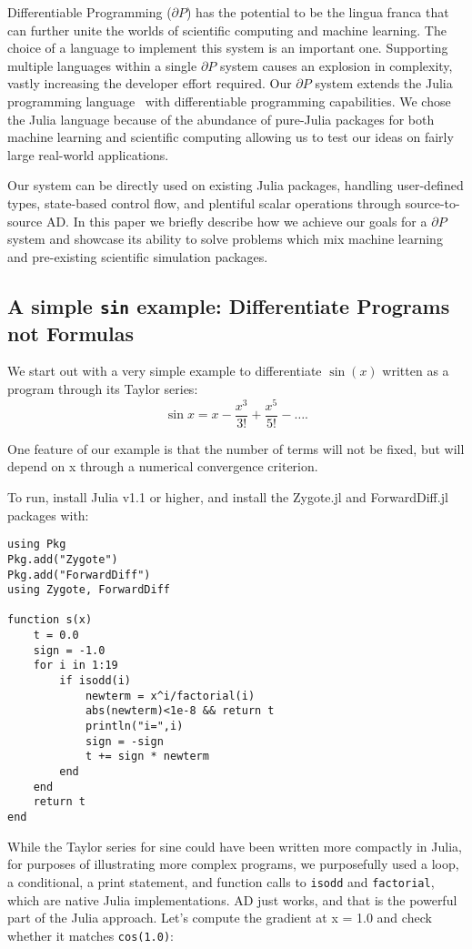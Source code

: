 \documentclass{juliacon}
\begin{document}
    Differentiable Programming ($\partial P$) has the potential to be the lingua franca that can further unite the worlds of scientific computing and machine learning. The choice of a language to implement this system is an important one. Supporting multiple languages within a single $\partial P$ system causes an explosion in complexity, vastly increasing the developer effort required. Our $\partial P$ system extends the Julia programming language~\cite{Julia-2017-a} with differentiable programming capabilities. We chose the Julia language because of the abundance of pure-Julia packages for both machine learning and scientific computing allowing us to test our ideas on fairly large real-world applications.
    
    Our system can be directly used on existing Julia packages, handling  user-defined types, state-based control flow, and plentiful scalar operations through source-to-source AD. In this paper we briefly describe how we achieve our goals for a $\partial P$ system and showcase its ability to solve problems which mix machine learning and pre-existing scientific simulation packages. 
    
\subsection{A simple {\tt sin} example: Differentiate Programs not Formulas}

We start out with a very simple example to differentiate $\sin(x)$ written as a program through its Taylor series:
$$\sin x =
x - \frac{x^3}{3!}
+\frac{x^5}{5!}-\ldots .$$


One feature of our example is that the number of terms will not be fixed, but will depend on x through a numerical convergence criterion.

To run, install Julia v1.1 or higher, and install the Zygote.jl and ForwardDiff.jl packages with:

\begin{lstlisting}
using Pkg
Pkg.add("Zygote")
Pkg.add("ForwardDiff")
using Zygote, ForwardDiff

function s(x) 
    t = 0.0
    sign = -1.0 
    for i in 1:19   
        if isodd(i)
            newterm = x^i/factorial(i)
            abs(newterm)<1e-8 && return t
            println("i=",i)
            sign = -sign
            t += sign * newterm
        end
    end
    return t 
end
\end{lstlisting}

While the Taylor series for sine could have been written more compactly in Julia, for purposes of illustrating more complex programs, we purposefully used a loop, a conditional, a print statement, and function calls to \verb+isodd+ and \verb+factorial+, which are native Julia implementations. AD just works, and that is the powerful part of the Julia approach. Let’s compute the gradient at x = 1.0 and check whether it matches \verb+cos(1.0)+:
\end{document}
